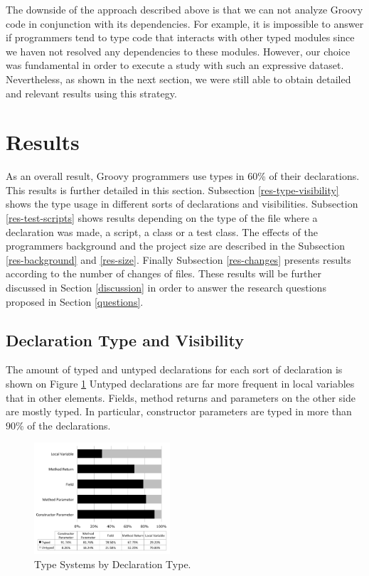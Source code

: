 \documentclass[preprint]{sigplanconf}
\begin{document}
The downside of the approach described above is that we can not analyze Groovy code in conjunction with its dependencies. 
For example, it is impossible to answer if programmers tend to type code that interacts with other typed modules since we haven not resolved any dependencies to these modules.
However, our choice was fundamental in order to execute a study with such an expressive dataset.
Nevertheless, as shown in the next section, we were still able to obtain detailed and relevant results using this strategy.











%
%
\section{Results\label{results}}
As an overall result, Groovy programmers use types in 60\% of their declarations.
This results is further detailed in this section.
Subsection \ref{res-type-visibility} shows the type usage in different sorts of declarations and visibilities.
Subsection \ref{res-test-scripts} shows results depending on the type of the file where a declaration was made, a script, a class or a test class.
The effects of the programmers background and the project size are described in the Subsection \ref{res-background} and \ref{res-size}.
Finally Subsection \ref{res-changes} presents results according to the number of changes of files.
These results will be further discussed in Section \ref{discussion} in order to answer the research questions proposed in Section \ref{questions}.

\subsection{Declaration Type and Visibility\label{res-type-visibility}}
The amount of typed and untyped declarations for each sort of declaration is shown on Figure \ref{fig:tipo_declaracao} 
Untyped declarations are far more frequent in local variables that in other elements.
Fields, method returns and parameters on the other side are mostly typed. In particular, constructor parameters are typed in more than $90\%$ of the declarations.

\begin{figure}[h]
\centering 
\includegraphics[width=0.45\textwidth]{type} 
\caption{Type Systems by Declaration Type.}
\label{fig:tipo_declaracao} 
\end{figure}
\end{document}
